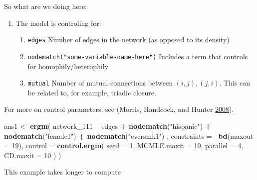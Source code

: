 \documentclass[]{book}
\newenvironment{Shaded}{\begin{snugshade}}{\end{snugshade}}
\newcommand{\KeywordTok}[1]{\textcolor[rgb]{0.13,0.29,0.53}{\textbf{#1}}}
\newcommand{\DataTypeTok}[1]{\textcolor[rgb]{0.13,0.29,0.53}{#1}}
\newcommand{\DecValTok}[1]{\textcolor[rgb]{0.00,0.00,0.81}{#1}}
\newcommand{\StringTok}[1]{\textcolor[rgb]{0.31,0.60,0.02}{#1}}
\newcommand{\OperatorTok}[1]{\textcolor[rgb]{0.81,0.36,0.00}{\textbf{#1}}}
\newcommand{\NormalTok}[1]{#1}
\theoremstyle{definition}
\theoremstyle{definition}
\theoremstyle{definition}
\theoremstyle{remark}
\begin{document}
So what are we doing here:

\begin{enumerate}
\def\labelenumi{\arabic{enumi}.}
\item
  The model is controling for:

  \begin{enumerate}
  \def\labelenumii{\alph{enumii}.}
  \item
    \texttt{edges} Number of edges in the network (as opposed to its
    density)
  \item
    \texttt{nodematch("some-variable-name-here")} Includes a term that
    controls for homophily/heterophily
  \item
    \texttt{mutual} Number of mutual connections between
    \((i, j), (j, i)\). This can be related to, for example, triadic
    closure.
  \end{enumerate}
\end{enumerate}

For more on control parameters, see (Morris, Handcock, and Hunter
\protect\hyperlink{ref-Morris2008}{2008}).

\begin{Shaded}
\begin{Highlighting}[]
\NormalTok{ans1 <-}\StringTok{ }\KeywordTok{ergm}\NormalTok{(}
\NormalTok{  network_}\DecValTok{111} \OperatorTok{~}
\StringTok{    }\NormalTok{edges }\OperatorTok{+}
\StringTok{    }\KeywordTok{nodematch}\NormalTok{(}\StringTok{"hispanic"}\NormalTok{) }\OperatorTok{+}
\StringTok{    }\KeywordTok{nodematch}\NormalTok{(}\StringTok{"female1"}\NormalTok{) }\OperatorTok{+}
\StringTok{    }\KeywordTok{nodematch}\NormalTok{(}\StringTok{"eversmk1"}\NormalTok{)}
\NormalTok{    ,}
  \DataTypeTok{constraints =} \OperatorTok{~}\KeywordTok{bd}\NormalTok{(}\DataTypeTok{maxout =} \DecValTok{19}\NormalTok{),}
  \DataTypeTok{control =} \KeywordTok{control.ergm}\NormalTok{(}
    \DataTypeTok{seed        =} \DecValTok{1}\NormalTok{,}
    \DataTypeTok{MCMLE.maxit =} \DecValTok{10}\NormalTok{,}
    \DataTypeTok{parallel    =} \DecValTok{4}\NormalTok{,}
    \DataTypeTok{CD.maxit    =} \DecValTok{10}
\NormalTok{    )}
\NormalTok{  )}
\end{Highlighting}
\end{Shaded}

This example takes longer to compute
\end{document}

